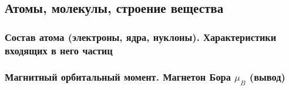 \subsection{Атомы, молекулы, строение вещества}

\subsubsection{Состав атома (электроны, ядра, нуклоны). Характеристики входящих в него частиц}

\subsubsection{Магнитный орбитальный момент. Магнетон Бора $\mu_B$ (вывод)}
